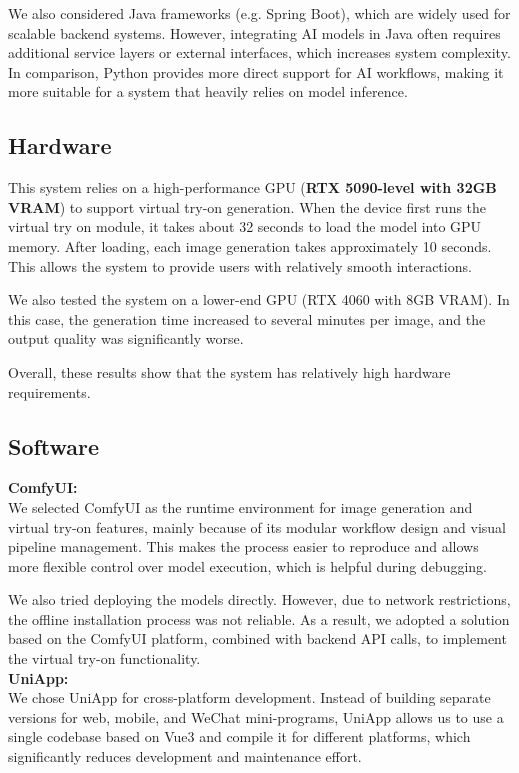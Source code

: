 We also considered Java frameworks (e.g. Spring Boot), which are widely used for scalable backend systems. However, integrating AI models in Java often requires additional service layers or external interfaces, which increases system complexity. In comparison, Python provides more direct support for AI workflows, making it more suitable for a system that heavily relies on model inference.



\subsection{Hardware}
This system relies on a high-performance GPU (\textbf{RTX 5090-level with 32GB VRAM}) to support virtual try-on generation. When the device first runs the virtual try on module, it takes about 32 seconds to load the model into GPU memory. After loading, each image generation takes approximately 10 seconds. This allows the system to provide users with relatively smooth interactions.

We also tested the system on a lower-end GPU (RTX 4060 with 8GB VRAM). In this case, the generation time increased to several minutes per image, and the output quality was significantly worse. 

Overall, these results show that the system has relatively high hardware requirements.

\subsection{Software}
\textbf{\large ComfyUI:}\\[0.4cm]
We selected ComfyUI as the runtime environment for image generation and virtual try-on features, mainly because of its modular workflow design and visual pipeline management. This makes the process easier to reproduce and allows more flexible control over model execution, which is helpful during debugging.

We also tried deploying the models directly. However, due to network restrictions, the offline installation process was not reliable. As a result, we adopted a solution based on the ComfyUI platform, combined with backend API calls, to implement the virtual try-on functionality.\\


\textbf{\large UniApp:}\\[0.4cm]
We chose UniApp for cross-platform development. Instead of building separate versions for web, mobile, and WeChat mini-programs, UniApp allows us to use a single codebase based on Vue3 and compile it for different platforms, which significantly reduces development and maintenance effort.

